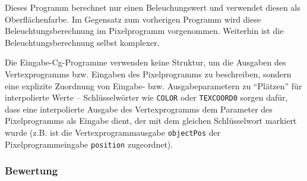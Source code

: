 \documentclass[twoside,a4paper,fleqn,12pt]{book}
\begin{document}

Dieses Programm berechnet nur einen Beleuchungswert und verwendet diesen als Oberflächenfarbe. Im Gegensatz zum
vorherigen Programm wird diese Beleuchtungsberechnung im Pixelprogramm vorgenommen.
Weiterhin ist die Beleuchtungsberechnung selbst komplexer.

{}

{}

Die Eingabe-Cg-Programme verwenden keine Struktur, um die Ausgaben des Vertexprogramms bzw. Eingaben
des Pixelprogramms zu beschreiben, sondern eine explizite Zuordnung von Eingabe- bzw. Ausgabeparametern
zu "`Plätzen"' für interpolierte Werte -- Schlüsselwörter wie \texttt{COLOR} oder \texttt{TEXCOORD0} sorgen dafür,
dass eine interpolierte Ausgabe des Vertexprogramms dem Parameter des Pixelprogramms als Eingabe dient,
der mit dem gleichen Schlüsselwort markiert wurde (z.B. ist die Vertexprogrammausgabe \texttt{objectPos}
der Pixelprogrammeingabe \texttt{position} zugeordnet).

{}

{}

\subsubsection{Bewertung}
\end{document}
